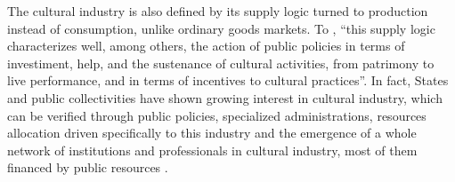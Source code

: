 \documentclass[a4paper, 12pt, openright, oneside, german, french, brazil, english, article]{abntex2}
\begin{document}
	

	The cultural industry is also defined by its supply logic turned to production instead of consumption, unlike ordinary goods markets. To , ``this supply logic characterizes well, among others, the action of public policies in terms of investiment, help, and the sustenance of cultural activities, from patrimony to live performance, and in terms of incentives to cultural practices''. In fact, States and public collectivities have shown growing interest in cultural industry, which can be verified through public policies, specialized administrations, resources allocation driven specifically to this industry and the emergence of a whole network of institutions and professionals in cultural industry, most of them financed by public resources \cite{tolila2007cultura}.

	
\end{document}
